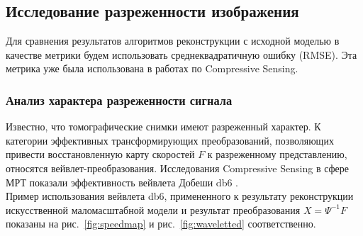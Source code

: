 \documentclass[14pt]{matmex-diploma-custom}
\begin{document}
\subsection{Исследование разреженности изображения}
Для сравнения результатов алгоритмов реконструкции с исходной моделью в качестве метрики будем использовать среднеквадратичную ошибку (RMSE). Эта метрика уже была использована в работах по Compressive Sensing.


\subsubsection*{Анализ характера разреженности сигнала} \label{sec:s_analysis}
Известно, что томографические снимки имеют разреженный характер. К категории эффективных трансформирующих преобразований, позволяющих привести восстановленную карту скоростей $F$ к разреженному представлению, относятся вейвлет-преобразования. Исследования Compressive Sensing в сфере МРТ показали эффективность вейвлета Добеши db6 \cite{lustig2007sparse}. \\
Пример использования вейвлета db6, примененного к результату реконструкции искусственной маломасштабной модели и результат преобразования $X = \Psi^{-1} F$ показаны на рис.~\ref{fig:speedmap} и рис.~\ref{fig:waveletted} соответственно.\\
\end{document}
